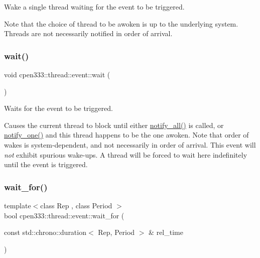 Wake a single thread waiting for the event to be triggered. 

Note that the choice of thread to be awoken is up to the underlying system. Threads are not necessarily notified in order of arrival. \mbox{\label{classcpen333_1_1thread_1_1event_a041bc99b2749b269ac3853a4b8bba678}} 
\subsubsection{\texorpdfstring{wait()}{wait()}}
{\footnotesize\ttfamily void cpen333\+::thread\+::event\+::wait (\begin{DoxyParamCaption}{ }\end{DoxyParamCaption})\hspace{0.3cm}{\ttfamily [inline]}}



Waits for the event to be triggered. 

Causes the current thread to block until either {\ttfamily \hyperlink{classcpen333_1_1thread_1_1event_ac41756fc84760cd537c78de31b3b25fa}{notify\+\_\+all()}} is called, or {\ttfamily \hyperlink{classcpen333_1_1thread_1_1event_a453552a68dff5c45321496e452495364}{notify\+\_\+one()}} and this thread happens to be the one awoken. Note that order of wakes is system-\/dependent, and not necessarily in order of arrival. This event will {\itshape not} exhibit spurious wake-\/ups. A thread will be forced to wait here indefinitely until the event is triggered. \mbox{\label{classcpen333_1_1thread_1_1event_a200e1b4dff248be78cc1ae9c993dec02}} 
\subsubsection{\texorpdfstring{wait\+\_\+for()}{wait\_for()}}
{\footnotesize\ttfamily template$<$class Rep , class Period $>$ \\
bool cpen333\+::thread\+::event\+::wait\+\_\+for (\begin{DoxyParamCaption}\item[{const std\+::chrono\+::duration$<$ Rep, Period $>$ \&}]{rel\+\_\+time }\end{DoxyParamCaption})\hspace{0.3cm}{\ttfamily [inline]}}



